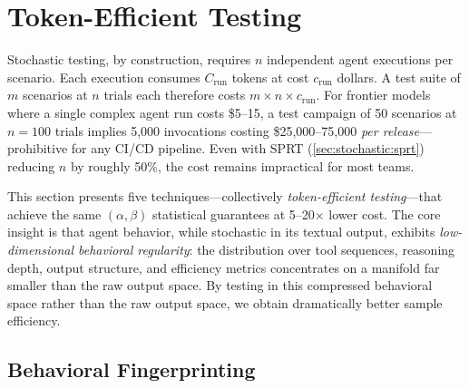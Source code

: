 
\section{Token-Efficient Testing}
\label{sec:token-efficient}

Stochastic testing, by construction, requires $n$ independent agent
executions per scenario. Each execution consumes $C_{\mathrm{run}}$
tokens at cost $c_{\mathrm{run}}$ dollars. A test suite of $m$ scenarios
at $n$ trials each therefore costs $m \times n \times c_{\mathrm{run}}$.
For frontier models where a single complex agent run costs \$5--15, a
test campaign of 50 scenarios at $n = 100$ trials implies 5{,}000
invocations costing \$25{,}000--75{,}000 \emph{per release}---prohibitive
for any CI/CD pipeline. Even with SPRT (\cref{sec:stochastic:sprt})
reducing $n$ by roughly 50\%, the cost remains impractical for most teams.

This section presents five techniques---collectively
\emph{token-efficient testing}---that achieve the same
$(\alpha, \beta)$ statistical guarantees at 5--20$\times$ lower cost.
The core insight is that agent behavior, while stochastic in its
textual output, exhibits \emph{low-dimensional behavioral regularity}:
the distribution over tool sequences, reasoning depth, output structure,
and efficiency metrics concentrates on a manifold far smaller than the
raw output space. By testing in this compressed behavioral space rather
than the raw output space, we obtain dramatically better sample
efficiency.

\subsection{Behavioral Fingerprinting}
\label{sec:token:fingerprint}


